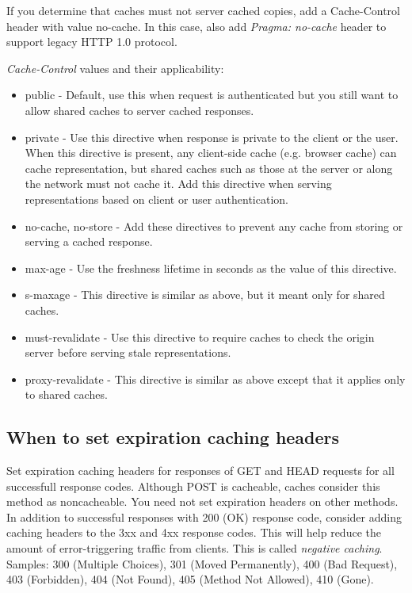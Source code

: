 \documentclass[11pt,a4paper]{article}
\begin{document}
If you determine that caches must not server cached copies, add a Cache-Control header with value no-cache. In this case, also add \textit{Pragma: no-cache} header to support legacy HTTP 1.0 protocol.

\textit{Cache-Control} values and their applicability:
\begin{itemize}
	\item public - Default, use this when request is authenticated but you still want to allow shared caches to server cached responses.
	\item private - Use this directive when response is private to the client or the user. When this directive is present, any client-side cache (e.g. browser cache) can cache representation, but shared caches such as those at the server or along the network must not cache it. Add this directive when serving representations based on client or user authentication.
	\item no-cache, no-store - Add these directives to prevent any cache from storing or serving a cached response.
	\item max-age - Use the freshness lifetime in seconds as the value of this directive.
	\item s-maxage - This directive is similar as above, but it meant only for shared caches.
	\item must-revalidate - Use this directive to require caches to check the origin server before serving stale representations.
	\item proxy-revalidate - This directive is similar as above except that it applies only to shared caches.
\end{itemize}

\subsection{When to set expiration caching headers}
Set expiration caching headers for responses of GET and HEAD requests for all successfull response codes. Although POST is cacheable, caches consider this method as noncacheable. You need not set expiration headers on other methods. In addition to successful responses with 200 (OK) response code, consider adding caching headers to the 3xx and 4xx response codes. This will help reduce the amount of error-triggering traffic from clients. This is called \textit{negative caching}. Samples: 300 (Multiple Choices), 301 (Moved Permanently), 400 (Bad Request), 403 (Forbidden), 404 (Not Found), 405 (Method Not Allowed), 410 (Gone).
\end{document}
